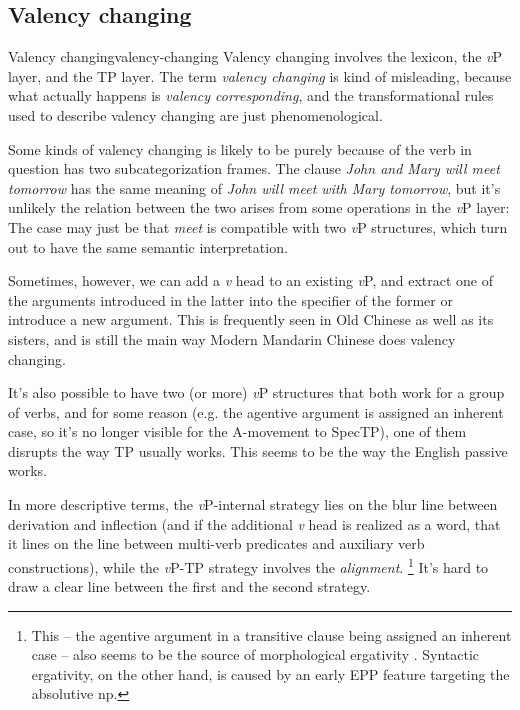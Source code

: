 \documentclass[UTF8, a4paper, oneside, scheme=plain]{ctexrep}
\newcommand*{\term}[1]{\emph{#1}}
\newcommand{\corpus}[1]{\emph{#1}}
\newcommand{\vP}{\textit{v}P}
\begin{document}
\subsection{Valency changing}\label{sec:overview.valency-changing}

\begin{theorybox}{Valency changing}{valency-changing}
    Valency changing involves the lexicon, the \vP{} layer, and the TP layer.
    The term \term{valency changing} is kind of misleading,
    because what actually happens is \emph{valency corresponding},
    and the transformational rules used to describe valency changing 
    are just phenomenological.

    Some kinds of valency changing is likely to be purely because of 
    the verb in question has two subcategorization frames.
    The clause \corpus{John and Mary will meet tomorrow} 
    has the same meaning of \corpus{John will meet with Mary tomorrow},
    but it's unlikely the relation between the two arises from some operations in the \vP{} layer:
    The case may just be that \corpus{meet} is compatible with two \vP{} structures,
    which turn out to have the same semantic interpretation.

    Sometimes, however, we can add a \term{v} head to an existing \vP{},
    and extract one of the arguments introduced in the latter into the specifier of the former
    or introduce a new argument.
    This is frequently seen in Old Chinese as well as its sisters,
    and is still the main way Modern Mandarin Chinese does valency changing.

    It's also possible to have two (or more) \vP{} structures that both work for a group of verbs,
    and for some reason (e.g. the agentive argument is assigned an inherent case, 
    so it's no longer visible for the A-movement to SpecTP),
    one of them disrupts the way TP usually works.
    This seems to be the way the English passive works.

    In more descriptive terms,
    the \vP-internal strategy lies on the blur line between derivation and inflection
    (and if the additional \term{v} head is realized as a word, 
    that it lines on the line between multi-verb predicates and auxiliary verb constructions),
    while the \vP-TP strategy involves the \emph{alignment}.%
    \footnote{
        This -- the agentive argument in a transitive clause being assigned an inherent case -- 
        also seems to be the source of morphological ergativity \citep{aldridge2008generative}.
        Syntactic ergativity, on the other hand, is caused by an early EPP feature 
        targeting the absolutive \acs{np}.
    }
    It's hard to draw a clear line between the first and the second strategy.
\end{theorybox}
\end{document}
